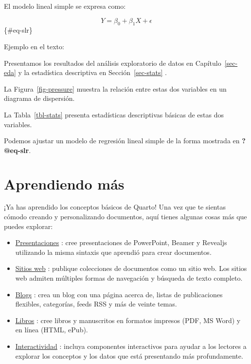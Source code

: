 \documentclass[
  spanish,
  12pt,
  letterpaper,
  DIV=11,
  numbers=noendperiod]{scrreprt}
\begin{document}
El modelo lineal simple se expresa como:

\[Y = \beta_0 + \beta_1 X + \epsilon\] \{\#eq-slr\}

Ejemplo en el texto:

Presentamos los resultados del análisis exploratorio de datos en
Capítulo~\ref{sec-eda} y la estadística descriptiva en
Sección~\ref{sec-stats} .

La Figura~\ref{fig-pressure} muestra la relación entre estas dos
variables en un diagrama de dispersión.

La Tabla~\ref{tbl-stats} presenta estadísticas descriptivas básicas de
estas dos variables.

Podemos ajustar un modelo de regresión lineal simple de la forma
mostrada en \textbf{?@eq-slr}.

\section{\texorpdfstring{\textbf{Aprendiendo
más}}{Aprendiendo más}}\label{aprendiendo-muxe1s-1}

¡Ya has aprendido los conceptos básicos de Quarto! Una vez que te
sientas cómodo creando y personalizando documentos, aquí tienes algunas
cosas más que puedes explorar:

\begin{itemize}
\item
  \href{https://quarto.org/docs/presentations/}{Presentaciones} : cree
  presentaciones de PowerPoint, Beamer y Revealjs utilizando la misma
  sintaxis que aprendió para crear documentos.
\item
  \href{https://quarto.org/docs/websites/}{Sitios web} : publique
  colecciones de documentos como un sitio web. Los sitios web admiten
  múltiples formas de navegación y búsqueda de texto completo.
\item
  \href{https://quarto.org/docs/websites/website-blog.html}{Blogs} :
  crea un blog con una página acerca de, listas de publicaciones
  flexibles, categorías, feeds RSS y más de veinte temas.
\item
  \href{https://quarto.org/docs/books/}{Libros} : cree libros y
  manuscritos en formatos impresos (PDF, MS Word) y en línea (HTML,
  ePub).
\item
  \href{https://quarto.org/docs/interactive/}{Interactividad} : incluya
  componentes interactivos para ayudar a los lectores a explorar los
  conceptos y los datos que está presentando más profundamente.
\end{itemize}
\end{document}
